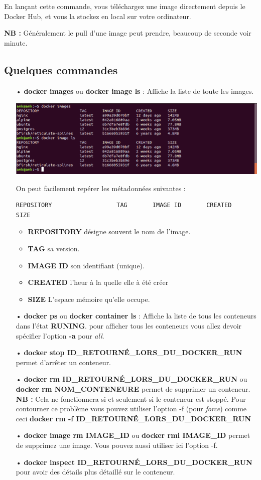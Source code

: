 \documentclass[12pt,a4paper]{article}
\begin{document}
En lançant cette commande, vous téléchargez une image directement depuis le Docker Hub, et vous la stockez en local sur votre ordinateur.

\textbf{NB : } Généralement le pull d'une image peut prendre, beaucoup de seconde voir minute.

\subsection{Quelques commandes}
\begin{itemize}
\item[•] \textbf{docker images} ou \textbf{docker image ls} : Affiche la liste de toute les
images.
\begin{center}
\includegraphics[scale=0.5]{img/docker_images.png}
\end{center}
On peut facilement repérer les métadonnées suivantes :
\begin{verbatim}
REPOSITORY                  TAG       IMAGE ID       CREATED       SIZE
\end{verbatim}
\begin{itemize}
\item \textbf{REPOSITORY} désigne souvent le nom de l'image.
\item \textbf{TAG} sa version.
\item \textbf{IMAGE ID} son identifiant (unique).
\item \textbf{CREATED} l'heur à la quelle elle à été créer 
\item \textbf{SIZE} L'espace mémoire qu'elle occupe.
\end{itemize}
\item[•] \textbf{docker ps} ou \textbf{docker container ls} : Affiche la liste de tous les
conteneurs dans l'état \textbf{RUNING}. pour afficher tous les conteneurs vous allez 
devoir spécifier l'option \textbf{-a} pour \textit{all}.
\item[•] \textbf{docker stop ID\_RETOURNÉ\_LORS\_DU\_DOCKER\_RUN} permet d'arrêter un conteneur.
\item[•] \textbf{docker rm ID\_RETOURNÉ\_LORS\_DU\_DOCKER\_RUN} ou \textbf{docker rm NOM\_CONTENEURE} permet de supprimer un conteneur.\\
\textbf{NB : } Cela ne fonctionnera si et seulement si le conteneur est stoppé. Pour 
contourner ce problème vous pouvez utiliser l'option -f (pour \textit{force}) comme ceci
\textbf{docker rm -f ID\_RETOURNÉ\_LORS\_DU\_DOCKER\_RUN} 
\item[•] \textbf{docker image rm IMAGE\_ID} ou \textbf{docker rmi IMAGE\_ID} permet 
de supprimez une image. Vous pouvez aussi utiliser ici l'option -f.
\item[•] \textbf{docker inspect ID\_RETOURNÉ\_LORS\_DU\_DOCKER\_RUN} pour avoir
des détails plus détaillé sur le conteneur.
\end{itemize}
\end{document}
